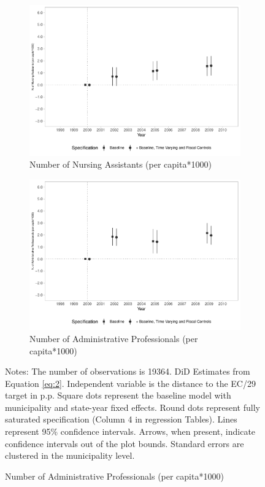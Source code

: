 \begin{figure}[h!]
\begin{center}
\begin{subfigure}{0.48\textwidth}
    \end{subfigure}
    \begin{subfigure}{0.48\textwidth}
        \centering
        \caption{\scriptsize Number of Nursing Assistants (per capita*1000)}\label{fig:10c}
        \includegraphics[width=\textwidth]{plots/ams_hr_elementary_pcapita_dist_ec29_baseline_dist_ec29_baseline_10.pdf}
    \end{subfigure}
    \begin{subfigure}{0.48\textwidth}
        \centering
        \caption{\scriptsize Number of Administrative Professionals (per capita*1000)}\label{fig:10d}
        \includegraphics[width=\textwidth]{plots/ams_hr_admin_pcapita_dist_ec29_baseline_dist_ec29_baseline_10.pdf}
    \end{subfigure}
    
    \end{center}
    \scriptsize{Notes: The number of observations is 19364. DiD Estimates from Equation \ref{eq:2}. Independent variable is the distance to the EC/29 target in p.p. Square dots represent the baseline model with municipality and state-year fixed effects. Round dots represent fully saturated specification (Column 4 in regression Tables). Lines represent 95\% confidence intervals. Arrows, when present, indicate confidence intervals out of the plot bounds. Standard errors are clustered in the municipality level.}
    
\end{figure}
